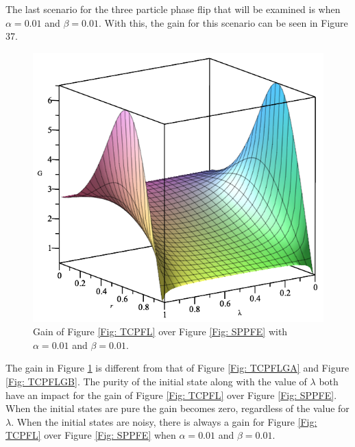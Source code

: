 \documentclass[twocolumn]{article}
\begin{document}
The last scenario for the three particle phase flip that will be examined is when $\alpha=0.01$ and $\beta=0.01$. With this, the gain for this scenario can be seen in Figure 37.
\begin{figure}[ht]
    \centering
    \includegraphics[scale=0.35]{Phase-Flip-Triple-Channel-Alpha=001-Beta=001-Gain-Graph.png}
    \caption{\footnotesize{Gain of Figure \ref{Fig: TCPFL} over Figure \ref{Fig: SPPFE} with $\alpha=0.01$ and $\beta=0.01$.}}
    \label{Fig: TCPFLGAB} 
\end{figure}
\par \noindent
The gain in Figure \ref{Fig: TCPFLGAB} is different from that of Figure \ref{Fig: TCPFLGA} and Figure \ref{Fig: TCPFLGB}. The purity of the initial state along with the value of $\lambda$ both have an impact for the gain of Figure \ref{Fig: TCPFL} over Figure \ref{Fig: SPPFE}. When the initial states are pure the gain becomes zero, regardless of the value for $\lambda$. When the initial states are noisy, there is always a gain for Figure \ref{Fig: TCPFL} over Figure \ref{Fig: SPPFE} when $\alpha=0.01$ and $\beta=0.01$.
\end{document}

